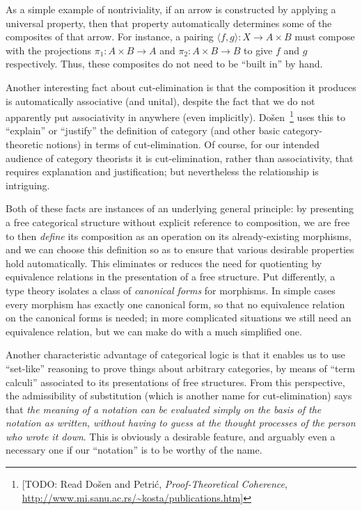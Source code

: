 \documentclass{book}
\def\pair#1#2{\langle #1,#2\rangle}
\begin{document}
As a simple example of nontriviality, if an arrow is constructed by applying a universal property, then that property automatically determines some of the composites of that arrow.
For instance, a pairing $\pair{f}{g}:X\to A\times B$ must compose with the projections $\pi_1:A\times B\to A$ and $\pi_2:A\times B\to B$ to give $f$ and $g$ respectively.
Thus, these composites do not need to be ``built in'' by hand.

Another interesting fact about cut-elimination is that the composition it produces is automatically associative (and unital), despite the fact that we do not apparently put associativity in anywhere (even implicitly).
Do\v{s}en~\cite{dosen:cutelim-cats}\footnote{[TODO: Read Do\v{s}en and Petri\'{c}, \textit{Proof-Theoretical Coherence}, \url{http://www.mi.sanu.ac.rs/~kosta/publications.htm}]} uses this to ``explain'' or ``justify'' the definition of category (and other basic category-theoretic notions) in terms of cut-elimination.
Of course, for our intended audience of category theorists it is cut-elimination, rather than associativity, that requires explanation and justification; but nevertheless the relationship is intriguing.

Both of these facts are instances of an underlying general principle: by presenting a free categorical structure without explicit reference to composition, we are free to then \emph{define} its composition as an operation on its already-existing morphisms, and we can choose this definition so as to ensure that various desirable properties hold automatically.
This eliminates or reduces the need for quotienting by equivalence relations in the presentation of a free structure.
Put differently, a type theory isolates a class of \emph{canonical forms} for morphisms.
In simple cases every morphism has exactly one canonical form, so that no equivalence relation on the canonical forms is needed; in more complicated situations we still need an equivalence relation, but we can make do with a much simplified one.

Another characteristic advantage of categorical logic is that it enables us to use ``set-like'' reasoning to prove things about arbitrary categories, by means of ``term calculi'' associated to its presentations of free structures.
From this perspective, the admissibility of substitution (which is another name for cut-elimination) says that \emph{the meaning of a notation can be evaluated simply on the basis of the notation as written, without having to guess at the thought processes of the person who wrote it down}.
This is obviously a desirable feature, and arguably even a necessary one if our ``notation'' is to be worthy of the name.
\end{document}
